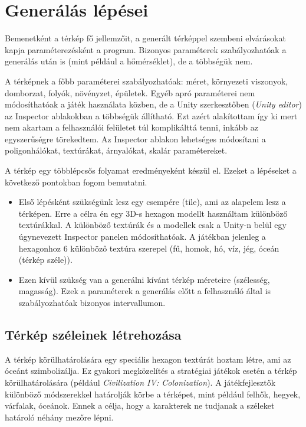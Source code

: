 \section{Generálás lépései}

Bemenetként a térkép fő jellemzőit, a generált térképpel szembeni elvárásokat kapja paraméterezésként a program. Bizonyos paraméterek szabályozhatóak a generálás után is (mint például a hőmérséklet), de a többségük nem.

A térképnek a főbb paraméterei szabályozhatóak: méret, környezeti viszonyok, domborzat, folyók, növényzet, épületek. Egyéb apró paraméterei nem módosíthatóak a játék használata közben, de a Unity szerkesztőben (\textit{Unity editor}) az Inspector ablakokban a többségük állítható. Ezt azért alakítottam így ki mert nem akartam a felhasználói felületet túl komplikálttá tenni, inkább az egyszerűségre törekedtem. Az Inspector ablakon lehetséges módosítani a poligonhálókat, textúrákat, árnyalókat, skalár paramétereket.

A térkép egy többlépcsős folyamat eredményeként készül el. Ezeket a lépéseket a következő pontokban fogom bemutatni.
\begin{itemize}
\item Első lépésként szükségünk lesz egy csempére (tile), ami az alapelem lesz a térképen. Erre a célra én egy 3D-s hexagon modellt használtam különböző textúrákkal. A különböző textúrák és a modellek csak a Unity-n belül egy úgynevezett Inspector panelen módosíthatóak. A játékban jelenleg a hexagonhoz 6 különböző textúra szerepel (fű, homok, hó, víz, jég, óceán (térkép széle)).
\item Ezen kívül szükség van a generálni kívánt térkép méreteire (szélesség, magasság). Ezek a paraméterek a generálás előtt a felhasználó által is szabályozhatóak bizonyos intervallumon.
\end{itemize}

\subsection{Térkép széleinek létrehozása}

A térkép körülhatárolására egy speciális hexagon textúrát hoztam létre, ami az óceánt szimbolizálja. Ez gyakori megközelítés a stratégiai játékok esetén a térkép körülhatárolására (például \textit{Civilization IV: Colonization}). A játékfejlesztők különböző módszerekkel határolják körbe a térképet, mint például felhők, hegyek, várfalak, óceánok. Ennek a célja, hogy a karakterek ne tudjanak a széleket határoló néhány mezőre lépni.

